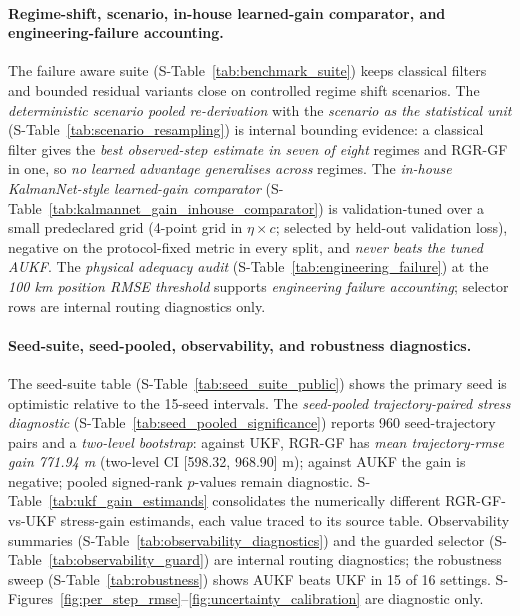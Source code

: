\documentclass{article}
\begin{document}
\paragraph{Regime-shift, scenario, in-house learned-gain comparator, and engineering-failure accounting.}
The failure aware suite (S-Table~\ref{tab:benchmark_suite}) keeps classical filters and bounded residual variants close on controlled regime shift scenarios. The \emph{deterministic scenario pooled re-derivation} with the \emph{scenario as the statistical unit} (S-Table~\ref{tab:scenario_resampling}) is internal bounding evidence: a classical filter gives the \emph{best observed-step estimate in seven of eight} regimes and RGR-GF in one, so \emph{no learned advantage generalises across} regimes. The \emph{in-house KalmanNet-style learned-gain comparator} (S-Table~\ref{tab:kalmannet_gain_inhouse_comparator}) is validation-tuned over a small predeclared grid (4-point grid in $\eta\times c$; selected by held-out validation loss), negative on the protocol-fixed metric in every split, and \emph{never beats the tuned AUKF}. The \emph{physical adequacy audit} (S-Table~\ref{tab:engineering_failure}) at the \emph{100 km position RMSE threshold} supports \emph{engineering failure accounting}; selector rows are internal routing diagnostics only.





\paragraph{Seed-suite, seed-pooled, observability, and robustness diagnostics.}
The seed-suite table (S-Table~\ref{tab:seed_suite_public}) shows the primary seed is optimistic relative to the 15-seed intervals. The \emph{seed-pooled trajectory-paired stress diagnostic} (S-Table~\ref{tab:seed_pooled_significance}) reports 960 seed-trajectory pairs and a \emph{two-level bootstrap}: against UKF, RGR-GF has \emph{mean trajectory-rmse gain 771.94 m} (two-level CI [598.32, 968.90] m); against AUKF the gain is negative; pooled signed-rank $p$-values remain diagnostic. S-Table~\ref{tab:ukf_gain_estimands} consolidates the numerically different RGR-GF-vs-UKF stress-gain estimands, each value traced to its source table. Observability summaries (S-Table~\ref{tab:observability_diagnostics}) and the guarded selector (S-Table~\ref{tab:observability_guard}) are internal routing diagnostics; the robustness sweep (S-Table~\ref{tab:robustness}) shows AUKF beats UKF in 15 of 16 settings. S-Figures~\ref{fig:per_step_rmse}--\ref{fig:uncertainty_calibration} are diagnostic only.






\end{document}
